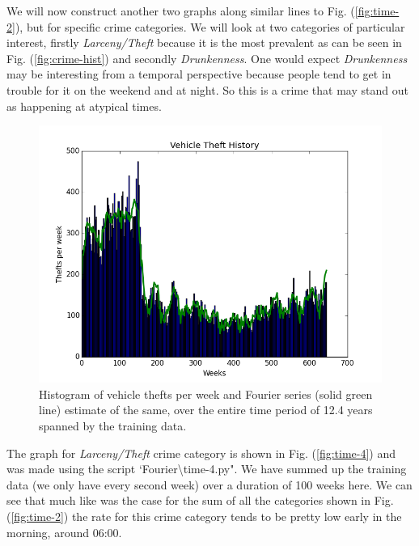 \documentclass[12pt,notitlepage]{article}
\begin{document}
We will now construct another two graphs along similar lines to Fig. (\ref{fig:time-2}), but for specific crime categories. We will look at two categories of particular interest, firstly \emph{Larceny/Theft} because it is the most prevalent as can be seen in Fig. (\ref{fig:crime-hist}) and secondly \emph{Drunkenness}. One would expect \emph{Drunkenness} may be interesting from a temporal perspective because people tend to get in trouble for it on the weekend and at night. So this is a crime that may stand out as happening at atypical times.
%
\begin{figure}
\centering{}\includegraphics[scale=0.7]{time-3}\caption{ Histogram of vehicle thefts per week and Fourier series (solid green line) estimate of the same, over the entire time period of 12.4 years spanned by the training data.\label{fig:time-3}}
\end{figure}
%
The graph for \emph{Larceny/Theft} crime category is shown in Fig. (\ref{fig:time-4}) and was made using the script `Fourier\textbackslash time-4.py". We have summed up the training data (we only have every second week) over a duration of 100 weeks here. We can see that much like was the case for the sum of all the categories shown in Fig. (\ref{fig:time-2}) the rate for this crime category tends to be pretty low early in the morning, around 06:00. 
\end{document}
